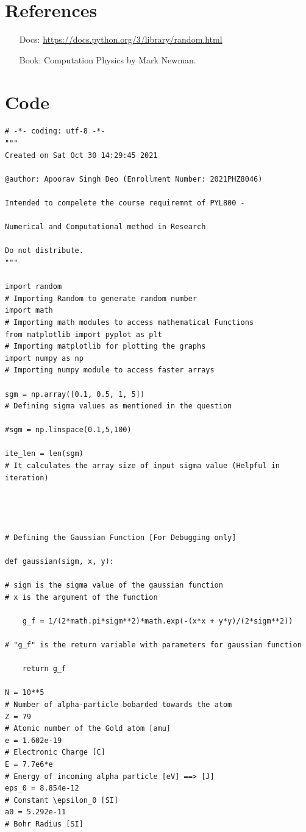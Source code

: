 \documentclass[11pt,a4paper]{article}
\begin{document}
\section{References}

\begin{enumerate}
\item [Docs:] \url{https://docs.python.org/3/library/random.html}
\item [Book:] Computation Physics by Mark Newman.
\end{enumerate}

\section{Code}
\begin{verbatim}
# -*- coding: utf-8 -*-
"""
Created on Sat Oct 30 14:29:45 2021

@author: Apoorav Singh Deo (Enrollment Number: 2021PHZ8046) 

Intended to compelete the course requiremnt of PYL800 - 

Numerical and Computational method in Research

Do not distribute.
"""

import random 
# Importing Random to generate random number
import math
# Importing math modules to access mathematical Functions
from matplotlib import pyplot as plt
# Importing matplotlib for plotting the graphs
import numpy as np
# Importing numpy module to access faster arrays

sgm = np.array([0.1, 0.5, 1, 5])
# Defining sigma values as mentioned in the question

#sgm = np.linspace(0.1,5,100)

ite_len = len(sgm)
# It calculates the array size of input sigma value (Helpful in iteration)




# Defining the Gaussian Function [For Debugging only]

def gaussian(sigm, x, y):

# sigm is the sigma value of the gaussian function
# x is the argument of the function

    g_f = 1/(2*math.pi*sigm**2)*math.exp(-(x*x + y*y)/(2*sigm**2))
    
# "g_f" is the return variable with parameters for gaussian function
    
    return g_f

N = 10**5
# Number of alpha-particle bobarded towards the atom
Z = 79
# Atomic number of the Gold atom [amu] 
e = 1.602e-19
# Electronic Charge [C]
E = 7.7e6*e
# Energy of incoming alpha particle [eV] ==> [J]
eps_0 = 8.854e-12
# Constant \epsilon_0 [SI]
a0 = 5.292e-11
# Bohr Radius [SI]


\end{verbatim}
\end{document}
